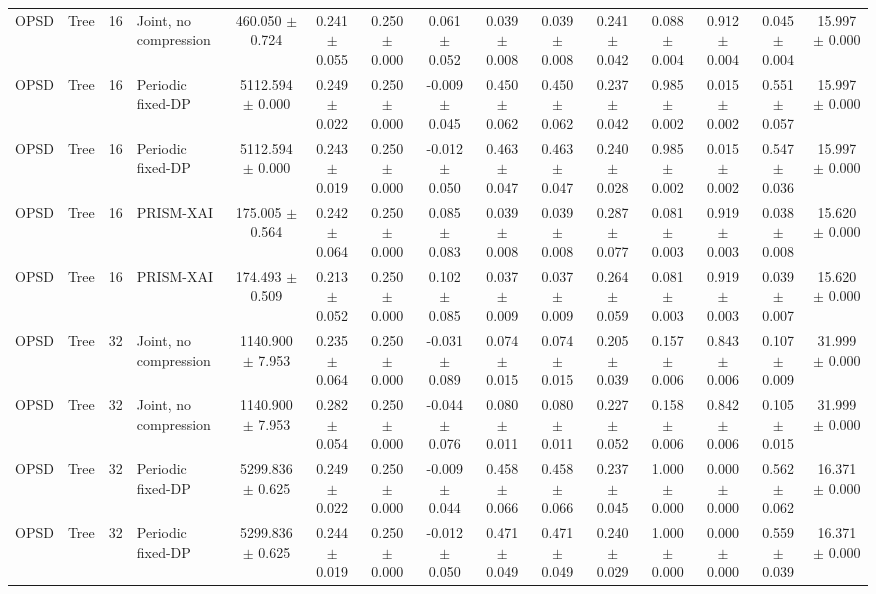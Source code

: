 \begin{table}[t]
\begin{tabular}{llllccccccccccc}
OPSD & Tree & 16 & Joint, no compression & 460.050 $\pm$ 0.724 & 0.241 $\pm$ 0.055 & 0.250 $\pm$ 0.000 & 0.061 $\pm$ 0.052 & 0.039 $\pm$ 0.008 & 0.039 $\pm$ 0.008 & 0.241 $\pm$ 0.042 & 0.088 $\pm$ 0.004 & 0.912 $\pm$ 0.004 & 0.045 $\pm$ 0.004 & 15.997 $\pm$ 0.000 \\
OPSD & Tree & 16 & Periodic fixed-DP & 5112.594 $\pm$ 0.000 & 0.249 $\pm$ 0.022 & 0.250 $\pm$ 0.000 & -0.009 $\pm$ 0.045 & 0.450 $\pm$ 0.062 & 0.450 $\pm$ 0.062 & 0.237 $\pm$ 0.042 & 0.985 $\pm$ 0.002 & 0.015 $\pm$ 0.002 & 0.551 $\pm$ 0.057 & 15.997 $\pm$ 0.000 \\
OPSD & Tree & 16 & Periodic fixed-DP & 5112.594 $\pm$ 0.000 & 0.243 $\pm$ 0.019 & 0.250 $\pm$ 0.000 & -0.012 $\pm$ 0.050 & 0.463 $\pm$ 0.047 & 0.463 $\pm$ 0.047 & 0.240 $\pm$ 0.028 & 0.985 $\pm$ 0.002 & 0.015 $\pm$ 0.002 & 0.547 $\pm$ 0.036 & 15.997 $\pm$ 0.000 \\
OPSD & Tree & 16 & PRISM-XAI & 175.005 $\pm$ 0.564 & 0.242 $\pm$ 0.064 & 0.250 $\pm$ 0.000 & 0.085 $\pm$ 0.083 & 0.039 $\pm$ 0.008 & 0.039 $\pm$ 0.008 & 0.287 $\pm$ 0.077 & 0.081 $\pm$ 0.003 & 0.919 $\pm$ 0.003 & 0.038 $\pm$ 0.008 & 15.620 $\pm$ 0.000 \\
OPSD & Tree & 16 & PRISM-XAI & 174.493 $\pm$ 0.509 & 0.213 $\pm$ 0.052 & 0.250 $\pm$ 0.000 & 0.102 $\pm$ 0.085 & 0.037 $\pm$ 0.009 & 0.037 $\pm$ 0.009 & 0.264 $\pm$ 0.059 & 0.081 $\pm$ 0.003 & 0.919 $\pm$ 0.003 & 0.039 $\pm$ 0.007 & 15.620 $\pm$ 0.000 \\
OPSD & Tree & 32 & Joint, no compression & 1140.900 $\pm$ 7.953 & 0.235 $\pm$ 0.064 & 0.250 $\pm$ 0.000 & -0.031 $\pm$ 0.089 & 0.074 $\pm$ 0.015 & 0.074 $\pm$ 0.015 & 0.205 $\pm$ 0.039 & 0.157 $\pm$ 0.006 & 0.843 $\pm$ 0.006 & 0.107 $\pm$ 0.009 & 31.999 $\pm$ 0.000 \\
OPSD & Tree & 32 & Joint, no compression & 1140.900 $\pm$ 7.953 & 0.282 $\pm$ 0.054 & 0.250 $\pm$ 0.000 & -0.044 $\pm$ 0.076 & 0.080 $\pm$ 0.011 & 0.080 $\pm$ 0.011 & 0.227 $\pm$ 0.052 & 0.158 $\pm$ 0.006 & 0.842 $\pm$ 0.006 & 0.105 $\pm$ 0.015 & 31.999 $\pm$ 0.000 \\
OPSD & Tree & 32 & Periodic fixed-DP & 5299.836 $\pm$ 0.625 & 0.249 $\pm$ 0.022 & 0.250 $\pm$ 0.000 & -0.009 $\pm$ 0.044 & 0.458 $\pm$ 0.066 & 0.458 $\pm$ 0.066 & 0.237 $\pm$ 0.045 & 1.000 $\pm$ 0.000 & 0.000 $\pm$ 0.000 & 0.562 $\pm$ 0.062 & 16.371 $\pm$ 0.000 \\
OPSD & Tree & 32 & Periodic fixed-DP & 5299.836 $\pm$ 0.625 & 0.244 $\pm$ 0.019 & 0.250 $\pm$ 0.000 & -0.012 $\pm$ 0.050 & 0.471 $\pm$ 0.049 & 0.471 $\pm$ 0.049 & 0.240 $\pm$ 0.029 & 1.000 $\pm$ 0.000 & 0.000 $\pm$ 0.000 & 0.559 $\pm$ 0.039 & 16.371 $\pm$ 0.000 \\

\end{tabular}
\end{table}
